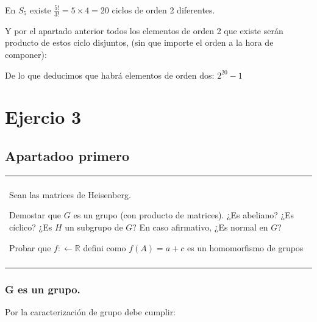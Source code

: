 \documentclass[12pt]{article}
\newenvironment{micaja}
{
    \begin{center}
    \begin{tabular}{|p{0.9\textwidth}|}
    \hline\\
    }   
    {   
    \\\\\hline
    \end{tabular} 
    \end{center}
    }
\begin{document}
En $S_5$ existe $\frac{5!}{3!} = 5\times 4 = 20$  ciclos de orden 2 diferentes. 

Y por el apartado anterior todos los elementos de orden 2 que existe serán producto de estos ciclo disjuntos, 
(sin que importe el orden a la hora de componer): 

De lo que deducimos que habrá elementos de orden dos: $2^{20} -1$

\newpage

\section{Ejercio 3}
\subsection{Apartadoo primero}

\begin{micaja}
    Sean las matrices de Heisenberg. 

    Demostar que $G$ es un grupo (con producto de matrices). ¿Es abeliano? ¿Es cíclico?
    ¿Es $H$ un subgrupo de $G$? En caso afirmativo, ¿Es normal en $G$?

    Probar que $f: \leftarrow \mathbb R$ defini como $f(A)=a+c$ es un homomorfismo de grupos 
\end{micaja}

\subsubsection*{G es un grupo.}

Por la caracterización de grupo debe cumplir: 
\end{document}
